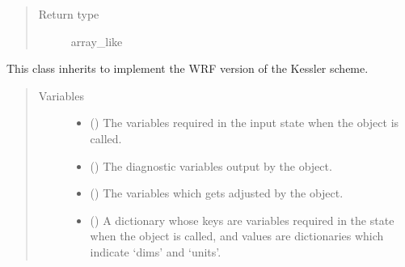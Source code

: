 \documentclass[letterpaper,10pt,english]{sphinxmanual}
\begin{document}
\begin{fulllineitems}
\begin{fulllineitems}
\begin{quote}
\begin{description}
\item[{Return type}] \leavevmode
array\_like

\end{description}\end{quote}

\end{fulllineitems}


\end{fulllineitems}


\begin{fulllineitems}
\label{\detokenize{api:tasmania.parameterizations.adjustment_microphysics_kessler_wrf.AdjustmentMicrophysicsKesslerWRF}}
This class inherits {\hyperref[\detokenize{api:tasmania.parameterizations.adjustments.AdjustmentMicrophysics}]{}}
to implement the WRF version of the Kessler scheme.
\begin{quote}\begin{description}
\item[{Variables}] \leavevmode\begin{itemize}
\item {} 
 () \textendash{} The variables required in the input state when the object is called.

\item {} 
 () \textendash{} The diagnostic variables output by the object.

\item {} 
 () \textendash{} The variables which gets adjusted by the object.

\item {} 
 () \textendash{} A dictionary whose keys are variables required in the state when the object is called,
and values are dictionaries which indicate ‘dims’ and ‘units’.


\end{itemize}
\end{description}
\end{quote}
\end{fulllineitems}
\end{document}
